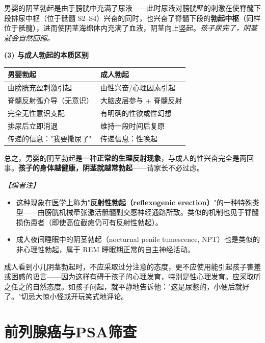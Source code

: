 男婴的阴茎勃起是由于膀胱中充满了尿液——此时尿液对膀胱壁的刺激在使脊髓下段排尿中枢（位于骶髓 S2--S4）兴奋的同时，也兴奋了脊髓下段的\textbf{勃起中枢}（同样位于骶髓），进而使阴茎海绵体内充满了血液，阴茎向上竖起。\textit{孩子尿完了，阴茎就会自然回缩。}

\vspace{0.3em}
\noindent\textbf{(3) 与成人勃起的本质区别}

\begin{tabular}{|p{5cm}|p{6cm}|}
\hline
\textbf{男婴勃起} & \textbf{成人勃起} \\
\hline
由膀胱充盈刺激引起 & 由性兴奋/心理因素引起 \\
\hline
脊髓反射弧介导（无意识） & 大脑皮层参与 + 脊髓反射 \\
\hline
完全无性意识支配 & 有明确的性欲或性幻想 \\
\hline
排尿后立即消退 & 维持一段时间后复原 \\
\hline
传递的信息："我要撒尿了" & 传递信息：性唤起 \\
\hline
\end{tabular}

总之，男婴的阴茎勃起是一种\textbf{正常的生理反射现象}，与成人的性兴奋完全是两回事。\textbf{孩子的身体越健康，阴茎就越常勃起}——请家长不必过虑。

\vspace{0.3em}
\noindent\textit{【编者注】}
\begin{itemize}
	\item 这种现象在医学上称为"\textbf{反射性勃起（reflexogenic erection）}"的一种特殊类型——由膀胱机械牵张激活骶髓副交感神经通路所致。类似的机制也见于脊髓损伤患者（即使高位截瘫仍可有反射性勃起）。
	\item 成人夜间睡眠中的阴茎勃起（nocturnal penile tumescence, NPT）也是类似的非心理性勃起，属于 REM 睡眠期正常的自主神经活动。
\end{itemize}

\begin{tcolorbox}[colback=pink!5!white,colframe=red!50!black,title=贴心小叮咛]
成人看到小儿阴茎勃起时，不应采取过分注意的态度，更不应使用能引起孩子害羞或困惑的语言——因为这样有碍于孩子的心理发育，特别是性心理发育。应采取听之任之的自然态度。如孩子问起，就平静地告诉他："这是尿憋的，小便后就好了。"切忌大惊小怪或开玩笑式地评论。
\end{tcolorbox}

\section{前列腺癌与PSA筛查}
\label{sec:prostate_cancer}

